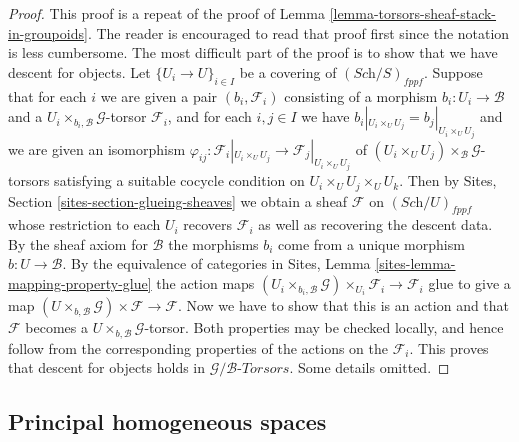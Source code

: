 \begin{proof}
This proof is a repeat of the proof of
Lemma \ref{lemma-torsors-sheaf-stack-in-groupoids}.
The reader is encouraged to read that proof first since
the notation is less cumbersome.
The most difficult part of the proof is to show that
we have descent for objects. Let $\{U_i \to U\}_{i \in I}$
be a covering of $(\textit{Sch}/S)_{fppf}$.
Suppose that for each $i$ we are given a pair $(b_i, \mathcal{F}_i)$
consisting of a morphism $b_i : U_i \to \mathcal{B}$ and a
$U_i \times_{b_i, \mathcal{B}} \mathcal{G}$-torsor
$\mathcal{F}_i$, and for each $i, j \in I$
we have $b_i|_{U_i \times_U U_j} = b_j|_{U_i \times_U U_j}$ and
we are given an isomorphism
$\varphi_{ij} :
\mathcal{F}_i|_{U_i \times_U U_j} \to \mathcal{F}_j|_{U_i \times_U U_j}$
of $(U_i \times_U U_j) \times_{\mathcal{B}} \mathcal{G}$-torsors
satisfying a suitable cocycle condition on $U_i \times_U U_j \times_U U_k$.
Then by
Sites, Section \ref{sites-section-glueing-sheaves}
we obtain a sheaf $\mathcal{F}$ on $(\textit{Sch}/U)_{fppf}$
whose restriction to each $U_i$ recovers $\mathcal{F}_i$ as well
as recovering the descent data. By the sheaf axiom for $\mathcal{B}$
the morphisms $b_i$ come from a unique morphism $b : U \to \mathcal{B}$.
By the equivalence of categories in
Sites, Lemma \ref{sites-lemma-mapping-property-glue}
the action maps
$(U_i \times_{b_i, \mathcal{B}} \mathcal{G}) \times_{U_i} \mathcal{F}_i
\to \mathcal{F}_i$
glue to give a map
$(U \times_{b, \mathcal{B}} \mathcal{G}) \times \mathcal{F} \to \mathcal{F}$.
Now we have to show that this is an action and that $\mathcal{F}$ becomes
a $U \times_{b, \mathcal{B}} \mathcal{G}$-torsor.
Both properties may be checked locally, and
hence follow from the corresponding properties of the actions
on the $\mathcal{F}_i$.
This proves that descent for objects holds in
$\mathcal{G}/\mathcal{B}\textit{-Torsors}$.
Some details omitted.
\end{proof}



\subsection{Principal homogeneous spaces}
\label{subsection-principal-homogeneous-spaces}

